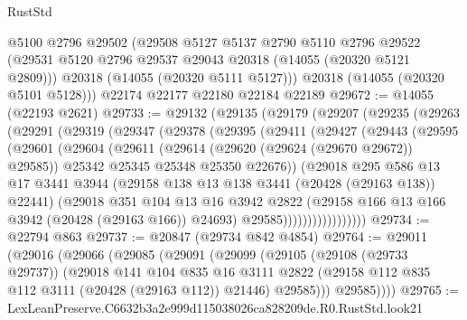 \begin{lexlean}{RustStd}
\begin{coremodule}
      @5100
      @2796
      @29502
      (@29508
        @5127
        @5137
        @2790
        @5110
        @2796
        @29522
        (@29531 @5120 @2796 @29537 @29043 @20318 (@14055 (@20320 @5121 @2809)))
        @20318
        (@14055 (@20320 @5111 @5127)))
      @20318
      (@14055 (@20320 @5101 @5128)))
    @22174
    @22177
    @22180
    @22184
    @22189
@29672 := @14055 (@22193 @2621)
@29733 := @29132
    (@29135
      (@29179
        (@29207
          (@29235
            (@29263
              (@29291
                (@29319
                  (@29347
                    (@29378
                      (@29395
                        (@29411
                          (@29427
                            (@29443
                              (@29595
                                (@29601
                                  (@29604
                                    (@29611
                                      (@29614 (@29620 (@29624 (@29670 @29672)) @29585))
                                      @25342
                                      @25345
                                      @25348
                                      @25350
                                      @22676))
                                  (@29018
                                    @295
                                    @586
                                    @13
                                    @17
                                    @3441
                                    @3944
                                    (@29158 @138 @13 @138 @3441 (@20428 (@29163 @138)) @22441)
                                    (@29018
                                      @351
                                      @104
                                      @13
                                      @16
                                      @3942
                                      @2822
                                      (@29158 @166 @13 @166 @3942 (@20428 (@29163 @166)) @24693)
                                      @29585)))))))))))))))))
@29734 := @22794 @863
@29737 := @20847 (@29734 @842 @4854)
@29764 := @29011
    (@29016
      (@29066
        (@29085
          (@29091
            (@29099
              (@29105
                (@29108 (@29733 @29737))
                (@29018
                  @141
                  @104
                  @835
                  @16
                  @3111
                  @2822
                  (@29158 @112 @835 @112 @3111 (@20428 (@29163 @112)) @21446)
                  @29585)))
            @29585))))
@29765 := LexLeanPreserve.C6632b3a2e999d115038026ca828209de.R0.RustStd.look21

\end{coremodule}
\end{lexlean}
